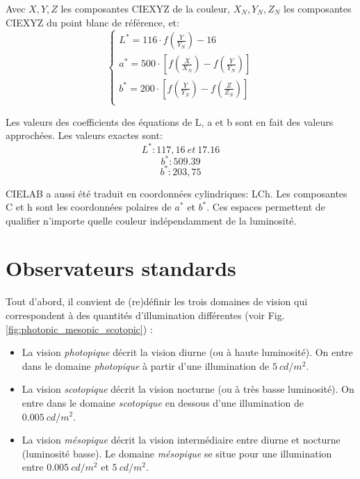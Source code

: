 	\par Avec $X, Y, Z$ les composantes CIEXYZ de la couleur, $X_N, Y_N, Z_N$ les composantes CIEXYZ du point blanc de référence, et:
	\begin{equation}
		\begin{cases}
		L^\ast=116 \cdot f(\frac{Y}{Y_N})-16\\
		a^\ast=500 \cdot \left[f(\frac{X}{X_N})-f(\frac{Y}{Y_N})\right]\\
		b^\ast=200 \cdot \left[f(\frac{Y}{Y_N})-f(\frac{Z}{Z_N})\right]\\
		\end{cases}
	\end{equation}
	
	\par Les valeurs des coefficients des équations de L, a et b sont en fait des valeurs approchées. Les valeurs exactes sont: \[L^\ast: 117,16~et~17.16\] \[b^\ast: 509.39\] \[b^\ast: 203,75\]
	
	\par CIELAB a aussi été traduit en coordonnées cylindriques: LCh. Les composantes C et h sont les coordonnées polaires de $a^\ast$ et $b^\ast$. Ces espaces permettent de qualifier n'importe quelle couleur indépendamment de la luminosité. 
		
	\section{Observateurs standards}
	\par Tout d'abord, il convient de (re)définir les trois domaines de vision qui correspondent à des quantités d'illumination différentes (voir Fig. \ref{fig:photopic_mesopic_scotopic}) \citep{damelincourt_eclairage_2010}:
	\begin{itemize}
		\item La vision \textit{photopique} décrit la vision diurne (ou à haute luminosité). On entre dans le domaine \textit{photopique} à partir d'une illumination de $5~cd/m^2$.
		\item La vision \textit{scotopique} décrit la vision nocturne (ou à très basse luminosité). On entre dans le domaine \textit{scotopique} en dessous d'une illumination de $0.005~cd/m^2$.
		\item La vision \textit{mésopique} décrit la vision intermédiaire entre diurne et nocturne (luminosité basse). Le domaine \textit{mésopique} se situe pour une illumination entre $0.005~cd/m^2$ et $5~cd/m^2$.	
	\end{itemize}
	

